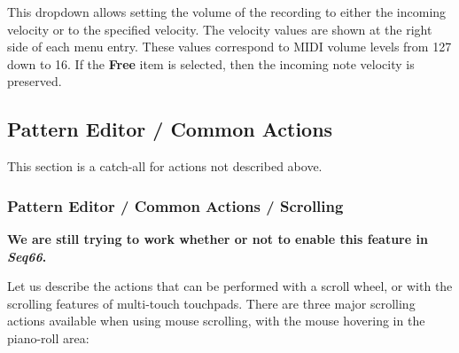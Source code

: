    This dropdown allows setting the volume of the recording to either the
   incoming velocity or to the specified velocity.
   The velocity values are shown at the right side of each menu entry.
   These values correspond to MIDI volume levels from 127 down to 16.
   If the \textbf{Free} item is selected, then the incoming note velocity is
   preserved.

\subsection{Pattern Editor / Common Actions}
\label{subsec:pattern_editor_common}

   This section is a catch-all for actions not described above.

\subsubsection{Pattern Editor / Common Actions / Scrolling}
\label{subsec:pattern_editor_scrolling}

   \textbf{We are still trying to work whether or not to enable this feature
   in \textsl{Seq66}.}

   Let us describe the actions that can be performed with a
   scroll wheel, or with the scrolling features of multi-touch touchpads.
   There are three major scrolling actions available when using mouse
   scrolling, with the mouse hovering in the piano-roll area:

